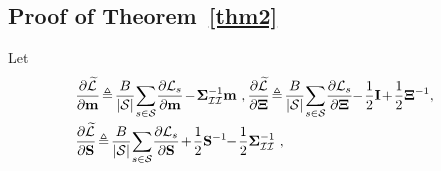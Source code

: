 \documentclass[conference]{IEEEtran}
\begin{document}
%
\vspace{-5mm}
\subsection{Proof of Theorem~\ref{thm2}}
	\label{A.3}
	\vspace{-2mm}
	Let
	\vspace{-1mm}
		\begin{equation}
			\hspace{-2.7mm}
			\begin{array}{l}
				\displaystyle\dfrac{\partial\widetilde{\mathcal{L}}}{\partial\mathbf{m}}\hspace{-0.5mm}\triangleq\hspace{-0.5mm}\dfrac{B}{|\mathcal{S}|}\hspace{-0.5mm}\sum_{s\in\mathcal{S}}\hspace{-0.5mm}\dfrac{\partial{\mathcal{L}}_s}{\partial\mathbf{m}}\hspace{-0.5mm}-\hspace{-0.5mm}\mathbf{\Sigma}_\mathcal{II}^{-1}\mathbf{m}\ , 
				\displaystyle\dfrac{\partial\widetilde{\mathcal{L}}}{\partial\mathbf{\Xi}}\hspace{-0.5mm}\triangleq\hspace{-0.5mm}\dfrac{B}{|\mathcal{S}|}\hspace{-0.5mm}\sum_{s\in\mathcal{S}}\hspace{-0.5mm}\dfrac{\partial{\mathcal{L}}_s}{\partial\mathbf{\Xi}}\hspace{-1mm}-\hspace{-0.5mm}\dfrac{1}{2}\mathbf{I}\hspace{-0.5mm}+\hspace{-0.5mm}\dfrac{1}{2}\mathbf{\Xi}^{-1},\vspace{1mm}\\
				\displaystyle\dfrac{\partial{\widetilde{\mathcal{L}}}}{\partial\mathbf{S}}\hspace{-0.5mm}\triangleq\hspace{-0.5mm}\dfrac{B}{|\mathcal{S}|}\hspace{-0.5mm}\sum_{s\in\mathcal{S}}\hspace{-0.5mm}\dfrac{\partial{\mathcal{L}}_s}{\partial\mathbf{S}}\hspace{-0.5mm}+\hspace{-0.5mm}\dfrac{1}{2}\mathbf{S}^{-1}\hspace{-1mm}-\hspace{-0.5mm}\dfrac{1}{2}\mathbf{\Sigma}_\mathcal{II}^{-1}\ , \ 

\end{array}
\end{equation}
\end{document}

